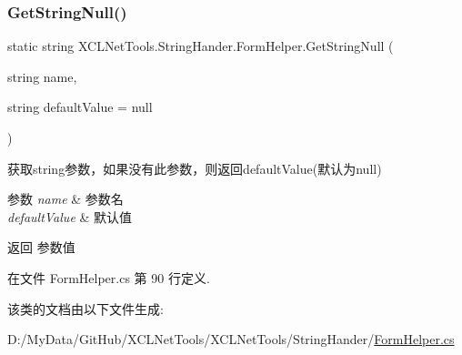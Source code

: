 \subsubsection{\texorpdfstring{Get\+String\+Null()}{GetStringNull()}}
{\footnotesize\ttfamily static string X\+C\+L\+Net\+Tools.\+String\+Hander.\+Form\+Helper.\+Get\+String\+Null (\begin{DoxyParamCaption}\item[{string}]{name,  }\item[{string}]{default\+Value = {\ttfamily null} }\end{DoxyParamCaption})\hspace{0.3cm}{\ttfamily [static]}}



获取string参数，如果没有此参数，则返回default\+Value(默认为null) 


\begin{DoxyParams}{参数}
{\em name} & 参数名\\
\hline
{\em default\+Value} & 默认值\\
\hline
\end{DoxyParams}
\begin{DoxyReturn}{返回}
参数值
\end{DoxyReturn}


在文件 Form\+Helper.\+cs 第 90 行定义.



该类的文档由以下文件生成\+:\begin{DoxyCompactItemize}
\item 
D\+:/\+My\+Data/\+Git\+Hub/\+X\+C\+L\+Net\+Tools/\+X\+C\+L\+Net\+Tools/\+String\+Hander/\hyperlink{_form_helper_8cs}{Form\+Helper.\+cs}\end{DoxyCompactItemize}
